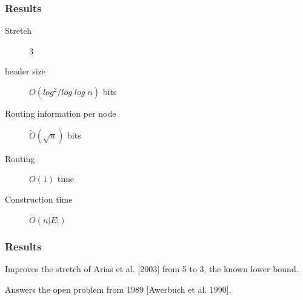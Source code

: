 \documentclass[10pt, compress]{beamer}
\begin{document}
\begin{frame}[fragile]
  \frametitle{Results}

  \begin{description}
    \item[Stretch] 3
    \item[header size] $O(log^2/log\;log\;n)$ bits
    \item[Routing information per node] $\tilde{O}(\sqrt{n})$ bits
    \item[Routing] $O(1)$ time
    \item[Construction time] $\tilde{O}(n|E|)$
  \end{description}

\end{frame}

\begin{frame}[fragile]
  \frametitle{Results}
  Improves the stretch of Arias et al. [2003] from 5 to 3, the known lower bound.

  Answers the open problem from 1989 [Awerbuch et al. 1990].

\end{frame}


\end{document}
